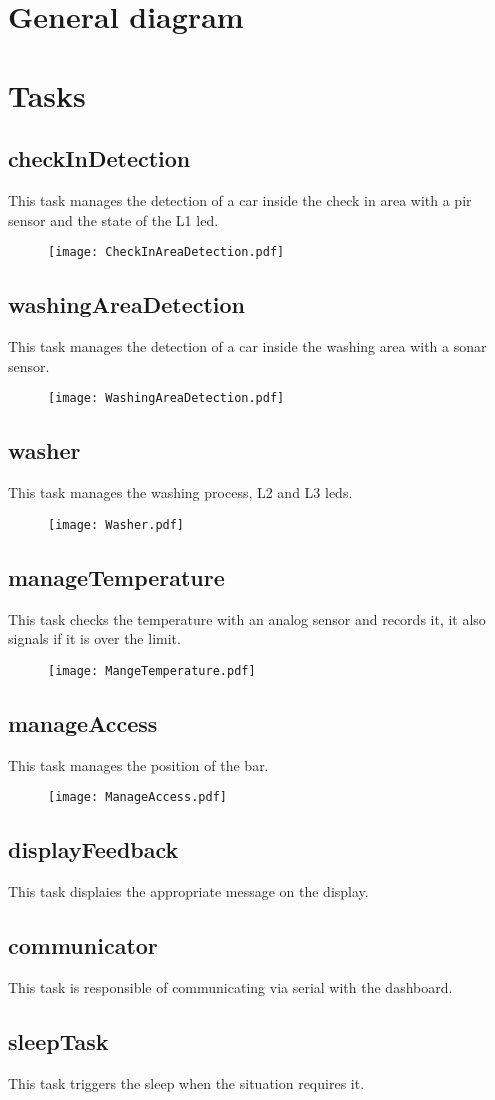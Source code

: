 \pagebreak
\section{General diagram}
\pagebreak
\section{Tasks}
\subsection{checkInDetection}
This task manages the detection of a car inside the check in area with a pir sensor and the state of the L1 led.
\begin{figure}[H]
    \centering
    \texttt{[image: CheckInAreaDetection.pdf]}
\end{figure}
\subsection{washingAreaDetection}
This task manages the detection of a car inside the washing area with a sonar sensor.
\begin{figure}[H]
    \centering
\texttt{[image: WashingAreaDetection.pdf]}
\end{figure}
\subsection{washer}
This task manages the washing process, L2 and L3 leds.
\begin{figure}[H]
    \centering
\texttt{[image: Washer.pdf]}
\end{figure}
\subsection{manageTemperature}
This task checks the temperature with an analog sensor and records it, it also signals if it is over the limit.
\begin{figure}[H]
    \centering
\texttt{[image: MangeTemperature.pdf]}
\end{figure}
\subsection{manageAccess}
This task manages the position of the bar.
\begin{figure}[H]
    \centering
\texttt{[image: ManageAccess.pdf]}
\end{figure}
\subsection{displayFeedback}
This task displaies the appropriate message on the display.
\subsection{communicator}
This task is responsible of communicating via serial with the dashboard.
\subsection{sleepTask}
This task triggers the sleep when the situation requires it.

